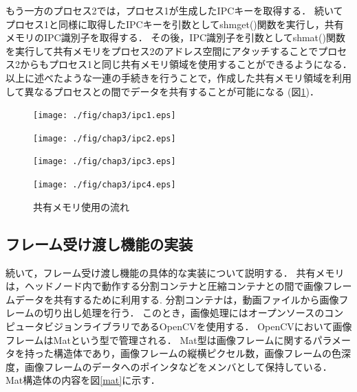 もう一方のプロセス2では，プロセス1が生成したIPCキーを取得する．
続いてプロセス1と同様に取得したIPCキーを引数としてshmget()関数を実行し，共有メモリのIPC識別子を取得する．
その後，IPC識別子を引数としてshmat()関数を実行して共有メモリをプロセス2のアドレス空間にアタッチすることでプロセス2からもプロセス1と同じ共有メモリ領域を使用することができるようになる．
以上に述べたような一連の手続きを行うことで，作成した共有メモリ領域を利用して異なるプロセスとの間でデータを共有することが可能になる (図\ref{shared_memory})．

\begin{figure}[H]
    \hspace*{\fill}
    \texttt{[image: ./fig/chap3/ipc1.eps]}
    \hspace*{\fill}
    
\end{figure}

\begin{figure}[H]
    \hspace*{\fill}
    \texttt{[image: ./fig/chap3/ipc2.eps]}
    \hspace*{\fill}
\end{figure}


\begin{figure}[H]
    \hspace*{\fill}
    \texttt{[image: ./fig/chap3/ipc3.eps]}
    \hspace*{\fill}
\end{figure}

\begin{figure}[H]
    \hspace*{\fill}
    \texttt{[image: ./fig/chap3/ipc4.eps]}
    \hspace*{\fill}
    \caption{共有メモリ使用の流れ}
    \label{shared_memory}
\end{figure}

\subsection*{フレーム受け渡し機能の実装}

続いて，フレーム受け渡し機能の具体的な実装について説明する．
共有メモリは，ヘッドノード内で動作する分割コンテナと圧縮コンテナとの間で画像フレームデータを共有するために利用する.
分割コンテナは，動画ファイルから画像フレームの切り出し処理を行う．
このとき，画像処理にはオープンソースのコンピュータビジョンライブラリであるOpenCVを使用する．
OpenCVにおいて画像フレームはMatという型で管理される．
Mat型は画像フレームに関するパラメータを持った構造体であり，画像フレームの縦横ピクセル数，画像フレームの色深度，画像フレームのデータへのポインタなどをメンバとして保持している．
Mat構造体の内容を図\ref{mat}に示す．

